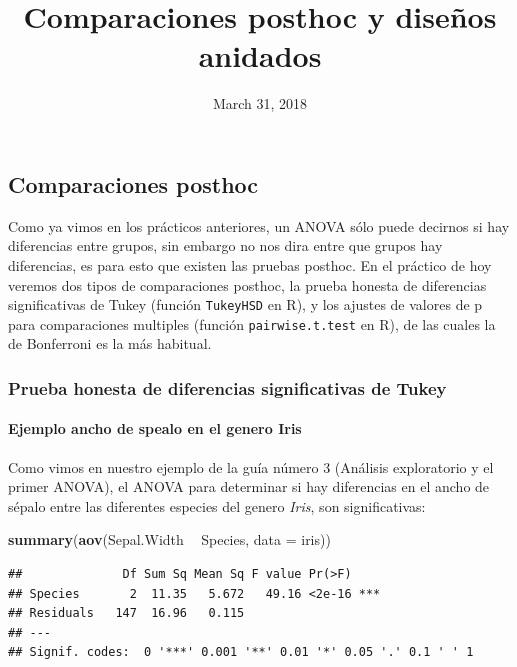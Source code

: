 \documentclass[]{article}
\title{Comparaciones posthoc y diseños anidados}
\author{}
\date{March 31, 2018}
\newenvironment{Shaded}{\begin{snugshade}}{\end{snugshade}}
\newcommand{\KeywordTok}[1]{\textcolor[rgb]{0.13,0.29,0.53}{\textbf{#1}}}
\newcommand{\DataTypeTok}[1]{\textcolor[rgb]{0.13,0.29,0.53}{#1}}
\newcommand{\StringTok}[1]{\textcolor[rgb]{0.31,0.60,0.02}{#1}}
\newcommand{\OperatorTok}[1]{\textcolor[rgb]{0.81,0.36,0.00}{\textbf{#1}}}
\newcommand{\NormalTok}[1]{#1}
\let\oldparagraph\paragraph
\renewcommand{\paragraph}[1]{\oldparagraph{#1}\mbox{}}
\begin{document}
\maketitle

{
\setcounter{tocdepth}{2}
\tableofcontents
}
\subsection{Comparaciones posthoc}\label{comparaciones-posthoc}

Como ya vimos en los prácticos anteriores, un ANOVA sólo puede decirnos
si hay diferencias entre grupos, sin embargo no nos dira entre que
grupos hay diferencias, es para esto que existen las pruebas posthoc. En
el práctico de hoy veremos dos tipos de comparaciones posthoc, la prueba
honesta de diferencias significativas de Tukey (función
\texttt{TukeyHSD} en R), y los ajustes de valores de p para
comparaciones multiples (función \texttt{pairwise.t.test} en R), de las
cuales la de Bonferroni es la más habitual.

\subsubsection{Prueba honesta de diferencias significativas de
Tukey}\label{prueba-honesta-de-diferencias-significativas-de-tukey}

\paragraph{Ejemplo ancho de spealo en el genero
Iris}\label{ejemplo-ancho-de-spealo-en-el-genero-iris}

Como vimos en nuestro ejemplo de la guía número 3 (Análisis exploratorio
y el primer ANOVA), el ANOVA para determinar si hay diferencias en el
ancho de sépalo entre las diferentes especies del genero \emph{Iris},
son significativas:

\begin{Shaded}
\begin{Highlighting}[]
\KeywordTok{summary}\NormalTok{(}\KeywordTok{aov}\NormalTok{(Sepal.Width }\OperatorTok{~}\StringTok{ }\NormalTok{Species, }\DataTypeTok{data =}\NormalTok{ iris))}
\end{Highlighting}
\end{Shaded}

\begin{verbatim}
##              Df Sum Sq Mean Sq F value Pr(>F)    
## Species       2  11.35   5.672   49.16 <2e-16 ***
## Residuals   147  16.96   0.115                   
## ---
## Signif. codes:  0 '***' 0.001 '**' 0.01 '*' 0.05 '.' 0.1 ' ' 1
\end{verbatim}
\end{document}
